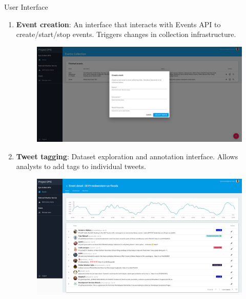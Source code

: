 \documentclass[final]{beamer}
\newlength{\onecolwid}
\newlength{\twocolwid}
\begin{document}
\begin{darkframes}
\begin{frame}
\begin{columns}[t]
\begin{column}{\twocolwid}
\begin{columns}[t,totalwidth=\twocolwid]
\begin{column}{\onecolwid}\vspace{-.74in} %


\begin{exampleblock}{User Interface}

\begin{enumerate}
\item \textbf{Event creation}: An interface that interacts with Events API to create/start/stop events. Triggers changes in collection infrastructure.
\begin{figure}
\includegraphics[width=1\linewidth]{img/event_creating.png}
\end{figure}
\item \textbf{Tweet tagging}: Dataset exploration and annotation interface. Allows analysts to add tags to individual tweets.
\begin{figure}
\includegraphics[width=1\linewidth]{img/tweets_tagging.png}
\end{figure}
\end{enumerate}





\end{exampleblock}
\end{column}
\end{columns}
\end{column}
\end{columns}
\end{frame}
\end{darkframes}
\end{document}
